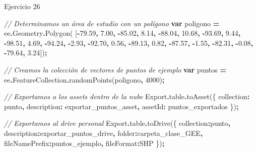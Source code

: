 \documentclass[
  12pt,
  letterpaper,
  twoside]{book}
\newenvironment{Shaded}{\begin{snugshade}}{\end{snugshade}}
\newcommand{\AttributeTok}[1]{\textcolor[rgb]{0.77,0.63,0.00}{#1}}
\newcommand{\CommentTok}[1]{\textcolor[rgb]{0.56,0.35,0.01}{\textit{#1}}}
\newcommand{\DataTypeTok}[1]{\textcolor[rgb]{0.13,0.29,0.53}{#1}}
\newcommand{\DecValTok}[1]{\textcolor[rgb]{0.00,0.00,0.81}{#1}}
\newcommand{\FloatTok}[1]{\textcolor[rgb]{0.00,0.00,0.81}{#1}}
\newcommand{\FunctionTok}[1]{\textcolor[rgb]{0.00,0.00,0.00}{#1}}
\newcommand{\KeywordTok}[1]{\textcolor[rgb]{0.13,0.29,0.53}{\textbf{#1}}}
\newcommand{\NormalTok}[1]{#1}
\newcommand{\OperatorTok}[1]{\textcolor[rgb]{0.81,0.36,0.00}{\textbf{#1}}}
\newcommand{\StringTok}[1]{\textcolor[rgb]{0.31,0.60,0.02}{#1}}
\begin{document}
Ejercicio 26

\begin{Shaded}
\begin{Highlighting}[]
\CommentTok{// Determinamos un área de estudio con un polígono}
\KeywordTok{var}\NormalTok{ poligono }\OperatorTok{=}\NormalTok{ ee}\OperatorTok{.}\AttributeTok{Geometry}\OperatorTok{.}\FunctionTok{Polygon}\NormalTok{(}
\NormalTok{        [}\OperatorTok{{-}}\FloatTok{79.59}\OperatorTok{,} \FloatTok{7.00}\OperatorTok{,}
          \OperatorTok{{-}}\FloatTok{85.02}\OperatorTok{,} \FloatTok{8.14}\OperatorTok{,}
          \OperatorTok{{-}}\FloatTok{88.04}\OperatorTok{,} \FloatTok{10.68}\OperatorTok{,}
          \OperatorTok{{-}}\FloatTok{93.69}\OperatorTok{,} \FloatTok{9.44}\OperatorTok{,}
          \OperatorTok{{-}}\FloatTok{98.51}\OperatorTok{,} \FloatTok{4.69}\OperatorTok{,}
          \OperatorTok{{-}}\FloatTok{94.24}\OperatorTok{,} \OperatorTok{{-}}\FloatTok{2.93}\OperatorTok{,}
          \OperatorTok{{-}}\FloatTok{92.70}\OperatorTok{,} \FloatTok{0.56}\OperatorTok{,}
          \OperatorTok{{-}}\FloatTok{89.13}\OperatorTok{,} \FloatTok{0.82}\OperatorTok{,}
          \OperatorTok{{-}}\FloatTok{87.57}\OperatorTok{,} \OperatorTok{{-}}\FloatTok{1.55}\OperatorTok{,}
          \OperatorTok{{-}}\FloatTok{82.31}\OperatorTok{,} \OperatorTok{{-}}\FloatTok{0.08}\OperatorTok{,}
          \OperatorTok{{-}}\FloatTok{79.64}\OperatorTok{,} \FloatTok{3.24}\NormalTok{])}\OperatorTok{;}

\CommentTok{// Creamos la colección de vectores de puntos de ejemplo}
\KeywordTok{var}\NormalTok{ puntos }\OperatorTok{=}\NormalTok{ ee}\OperatorTok{.}\AttributeTok{FeatureCollection}\OperatorTok{.}\FunctionTok{randomPoints}\NormalTok{(poligono}\OperatorTok{,} \DecValTok{4000}\NormalTok{)}\OperatorTok{;}

\CommentTok{// Exportamos a los assets dentro de la nube}
\NormalTok{Export}\OperatorTok{.}\AttributeTok{table}\OperatorTok{.}\FunctionTok{toAsset}\NormalTok{(\{}
  \DataTypeTok{collection}\OperatorTok{:}\NormalTok{ punto}\OperatorTok{,}
  \DataTypeTok{description}\OperatorTok{:} \StringTok{\textquotesingle{}exportar\_puntos\_asset\textquotesingle{}}\OperatorTok{,}
  \DataTypeTok{assetId}\OperatorTok{:} \StringTok{\textquotesingle{}puntos\_exportados\textquotesingle{}}
\NormalTok{\})}\OperatorTok{;}

\CommentTok{// Exportamos al drive personal}
\NormalTok{Export}\OperatorTok{.}\AttributeTok{table}\OperatorTok{.}\FunctionTok{toDrive}\NormalTok{(\{}
  \DataTypeTok{collection}\OperatorTok{:}\NormalTok{punto}\OperatorTok{,} 
  \DataTypeTok{description}\OperatorTok{:}\StringTok{\textquotesingle{}exportar\_puntos\_drive\textquotesingle{}}\OperatorTok{,}
  \DataTypeTok{folder}\OperatorTok{:}\StringTok{\textquotesingle{}carpeta\_clase\_GEE\textquotesingle{}}\OperatorTok{,}
  \DataTypeTok{fileNamePrefix}\OperatorTok{:}\StringTok{\textquotesingle{}puntos\_ejemplo\textquotesingle{}}\OperatorTok{,}
  \DataTypeTok{fileFormat}\OperatorTok{:}\StringTok{\textquotesingle{}SHP\textquotesingle{}}
\NormalTok{\})}\OperatorTok{;}
\end{Highlighting}
\end{Shaded}
\end{document}
